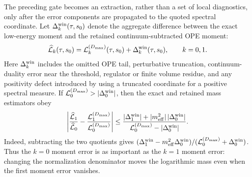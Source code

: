 \begin{controlledapproximation}
\label{ca:qcd-svz-two-scale-extraction-window}
The preceding gate becomes an extraction, rather than a set of local
diagnostics, only after the error components are propagated to the quoted
spectral coordinate.  Let
\(\Delta_k^{\rm win}(\tau,s_0)\) denote the aggregate difference between the
exact low-energy moment and the retained continuum-subtracted OPE moment:
\begin{equation}
  \widehat{\mathcal L}_k(\tau,s_0)
  =
  \mathcal L_k^{(D_{\max})}(\tau,s_0)
  +
  \Delta_k^{\rm win}(\tau,s_0),
  \qquad k=0,1 .
  \label{eq:qcd-svz-window-moment-residuals}
\end{equation}
Here \(\Delta_k^{\rm win}\) includes the omitted OPE tail, perturbative
truncation, continuum-duality error near the threshold, regulator or finite
volume residue, and any positivity defect introduced by using a truncated
coordinate for a positive spectral measure.  If
\(\mathcal L_0^{(D_{\max})}>|\Delta_0^{\rm win}|\), then the exact and
retained mass estimators obey
\begin{equation}
  \left|
  \frac{\widehat{\mathcal L}_1}{\widehat{\mathcal L}_0}
  -
  \frac{\mathcal L_1^{(D_{\max})}}{\mathcal L_0^{(D_{\max})}}
  \right|
  \le
  \frac{
    |\Delta_1^{\rm win}|
    +
    |m_{\rm eff}^2|\,|\Delta_0^{\rm win}|
  }{
    \mathcal L_0^{(D_{\max})}-|\Delta_0^{\rm win}|
  } .
  \label{eq:qcd-svz-window-mass-residual-bound}
\end{equation}
Indeed, subtracting the two quotients gives
\((\Delta_1^{\rm win}-m_{\rm eff}^2\Delta_0^{\rm win})/
(\mathcal L_0^{(D_{\max})}+\Delta_0^{\rm win})\).  Thus the \(k=0\)
moment error is as important as the \(k=1\) moment error: changing the
normalization denominator moves the logarithmic mass even when the first
moment error vanishes.


\end{controlledapproximation}
